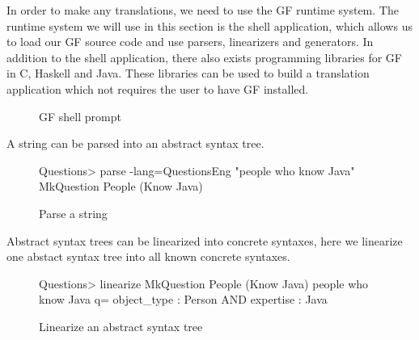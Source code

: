 In order to make any translations, we need to use the GF runtime system. The  runtime system we will use in this section is the shell application, which allows us to load our GF source code and use parsers, linearizers and generators. In addition to the shell application, there also exists programming libraries for GF in C, Haskell and Java. These libraries can be used to build a translation application which not requires the user to have GF installed.

\begin{figure}[H]

\caption{GF shell prompt\label{fig:gf-shell}}
\end{figure}

A string can be parsed into an abstract syntax tree.

\begin{figure}[H]
\begin{terminal}
Questions> parse -lang=QuestionsEng "people who know Java"
MkQuestion People (Know Java)
\end{terminal}

\caption{Parse a string\label{fig:parse-a-string}}
\end{figure}

Abstract syntax trees can be linearized into concrete syntaxes, here we linearize one abstact syntax tree into all known concrete syntaxes.

\begin{figure}[H]
\begin{terminal}
Questions> linearize MkQuestion People (Know Java)
people who know Java
q= object_type : Person AND expertise : Java
\end{terminal}

\caption{Linearize an abstract syntax tree\label{fig:linearization}}
\end{figure}

